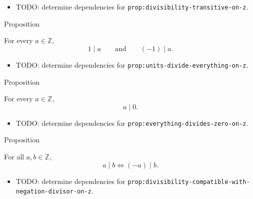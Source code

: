 \begin{dependencies}
\begin{itemize}
  \item TODO: determine dependencies for \texttt{prop:divisibility-transitive-on-z}.
\end{itemize}
\end{dependencies}

\begin{propositionbox}{Proposition}
\begin{proposition}
\label{prop:units-divide-everything-on-z}
For every $a\in\mathbb{Z}$,
\[
1\mid a
\qquad\text{and}\qquad
(-1)\mid a.
\]
\end{proposition}
\end{propositionbox}

\begin{dependencies}
\begin{itemize}
  \item TODO: determine dependencies for \texttt{prop:units-divide-everything-on-z}.
\end{itemize}
\end{dependencies}

\begin{propositionbox}{Proposition}
\begin{proposition}
\label{prop:everything-divides-zero-on-z}
For every $a\in\mathbb{Z}$,
\[
a\mid 0.
\]
\end{proposition}
\end{propositionbox}

\begin{dependencies}
\begin{itemize}
  \item TODO: determine dependencies for \texttt{prop:everything-divides-zero-on-z}.
\end{itemize}
\end{dependencies}

\begin{propositionbox}{Proposition}
\begin{proposition}
\label{prop:divisibility-compatible-with-negation-divisor-on-z}
For all $a,b\in\mathbb{Z}$,
\[
a\mid b \Longleftrightarrow (-a)\mid b.
\]
\end{proposition}
\end{propositionbox}

\begin{dependencies}
\begin{itemize}
  \item TODO: determine dependencies for \texttt{prop:divisibility-compatible-with-negation-divisor-on-z}.
\end{itemize}
\end{dependencies}

